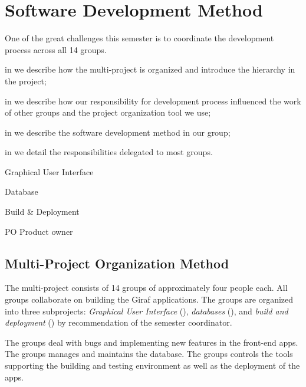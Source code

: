 \chapter{Software Development Method}\label{chap:sw_dev_method}
One of the great challenges this semester is to coordinate the development process across all 14 groups. 

\begin{chapterorganization}
  \item in  we describe how the multi-project is organized and introduce the hierarchy in the project;
  \item in  we describe how our responsibility for development process influenced the work of other groups and the project organization tool we use;
  \item in  we describe the software development method in our group;
  \item in  we detail the responsibilities delegated to most groups.
\end{chapterorganization}

\begin{abbreviations}
  \item[\gui] Graphical User Interface
  \item[\db] Database
  \item[\bd] Build \& Deployment
  \item[PO] Product owner
\end{abbreviations}

\section{Multi-Project Organization Method}\label{sec:project_overview}
The multi-project consists of 14 groups of approximately four people each. All groups collaborate on building the Giraf applications. The groups are organized into three subprojects: \emph{Graphical User Interface} (\gui), \emph{databases} (\db), and \emph{build and deployment} (\bd) by recommendation of the semester coordinator.

The \gui groups deal with bugs and implementing new features in the front-end apps. The \db groups manages and maintains the database. The \bd groups controls the tools supporting the building and testing environment as well as the deployment of the apps.

